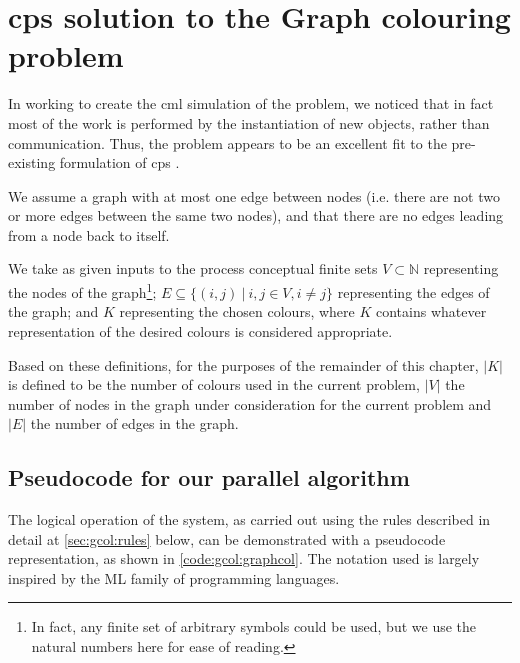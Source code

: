 \section{\label{sec:gcol:cpsys}\texorpdfstring{\gls{cps}}{cP systems} solution to the Graph colouring problem}
In working to create the \gls{cml} simulation of the problem, we noticed that in fact most of the work is performed by the instantiation of new objects, rather than communication.  Thus, the problem appears to be an excellent fit to the pre-existing formulation of \gls{cps} \cite{Nicolescu2018}.


We assume a graph with at most one edge between nodes (i.e. there are not two or more edges between the same two nodes), and that there are no edges leading from a node back to itself.

We take as given inputs to the process conceptual finite sets \(V \subset \mathbb{N}\) representing the nodes of the graph\footnote{In fact, any finite set of arbitrary symbols could be used, but we use the natural numbers here for ease of reading.}; \(E \subseteq \{(i,j)~|~i, j \in V, i \neq j \}\) representing the edges of the graph; and \(K\) representing the chosen colours, where \(K\) contains whatever representation of the desired colours is considered appropriate.

Based on these definitions, for the purposes of the remainder of this chapter, \(|K|\) is defined to be the number of colours used in the current problem, \(|V|\) the number of nodes in the graph under consideration for the current problem and \(|E|\) the number of edges in the graph.

\subsection{Pseudocode for our parallel algorithm}
The logical operation of the system, as carried out using the rules described in detail at \autoref{sec:gcol:rules} below, can be demonstrated with a pseudocode representation, as shown in \autoref{code:gcol:graphcol}.  The notation used is largely inspired by the ML family of programming languages.

